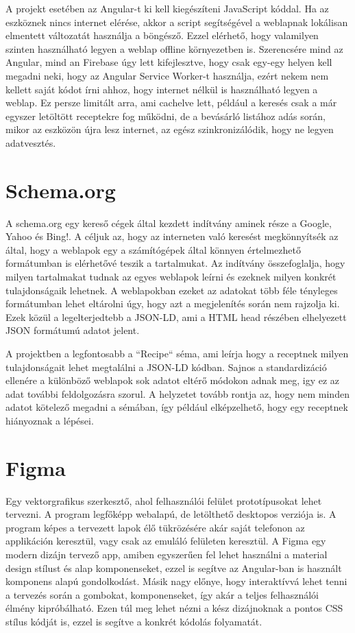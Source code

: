 \documentclass[12pt]{report}
\theoremstyle{definition}
\begin{document}
A projekt esetében az Angular-t ki kell kiegészíteni JavaScript kóddal. Ha az eszköznek nincs internet elérése, akkor a script segítségével a weblapnak lokálisan elmentett változatát használja a böngésző. Ezzel elérhető, hogy valamilyen szinten használható legyen a weblap offline környezetben is. Szerencsére mind az Angular, mind an Firebase úgy lett kifejlesztve, hogy csak egy-egy helyen kell megadni neki, hogy az Angular Service Worker-t használja, ezért nekem nem kellett saját kódot írni ahhoz, hogy internet nélkül is használható legyen a weblap. Ez persze limitált arra, ami cachelve lett, például a keresés csak a már egyszer letöltött receptekre fog működni, de a bevásárló listához adás során, mikor az eszközön újra lesz internet, az egész szinkronizálódik, hogy ne legyen adatvesztés.

\section{Schema.org}
A schema.org egy kereső cégek által kezdett indítvány aminek része a Google, Yahoo és Bing!. A céljuk az, hogy az interneten való keresést megkönnyítsék az által, hogy a weblapok egy a számítógépek által könnyen értelmezhető formátumban is elérhetővé teszik a tartalmukat. Az indítvány összefoglalja, hogy milyen tartalmakat tudnak az egyes weblapok leírni és ezeknek milyen konkrét tulajdonságaik lehetnek. A weblapokban ezeket az adatokat több féle tényleges formátumban lehet eltárolni úgy, hogy azt a megjelenítés során nem rajzolja ki. Ezek közül a legelterjedtebb a JSON-LD, ami a HTML head részében elhelyezett JSON formátumú adatot jelent.

A projektben a legfontosabb a “Recipe“ séma, ami leírja hogy a receptnek milyen tulajdonságait lehet megtalálni a JSON-LD kódban. Sajnos a standardizáció ellenére a különböző weblapok sok adatot eltérő módokon adnak meg, igy ez az adat további feldolgozásra szorul. A helyzetet tovább rontja az, hogy nem minden adatot kötelező megadni a sémában, így például elképzelhető, hogy egy receptnek hiányoznak a lépései. 


\section{Figma}
Egy  vektorgrafikus szerkesztő, ahol felhasználói felület prototípusokat lehet tervezni. A program legfőképp webalapú, de letölthető desktopos verziója is. A program képes a tervezett lapok élő tükrözésére akár saját telefonon az applikáción keresztül, vagy csak az emuláló felületen keresztül. A Figma egy modern dizájn tervező app, amiben egyszerűen fel lehet használni a material design stílust és alap komponenseket, ezzel is segítve az Angular-ban is használt komponens alapú gondolkodást. Másik nagy előnye, hogy interaktívvá lehet tenni a tervezés során a gombokat, komponenseket, így akár a teljes felhasználói élmény kipróbálható. Ezen túl meg lehet nézni a kész dizájnoknak  a pontos CSS stílus kódját is, ezzel is segítve a konkrét kódolás folyamatát.
\end{document}
